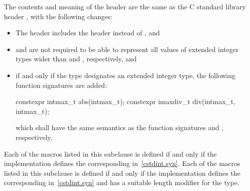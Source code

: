 \pnum
The contents and meaning of the header 
are the same as the C standard library header ,
with the following changes:
\begin{itemize}
\item
The header  includes the header  instead
of , and
\item
{} and  are not required
to be able to represent all values of extended integer types
wider than  and , respectively, and
\item
if and only if the type  designates an extended integer
type, the following function signatures are added:
\begin{codeblock}
constexpr intmax_t abs(intmax_t);
constexpr imaxdiv_t div(intmax_t, intmax_t);
\end{codeblock}
which shall have the same semantics as the function signatures
 and
, respectively.
\end{itemize}


\pnum
Each of the  macros listed in this subclause
is defined if and only if the implementation
defines the corresponding  in~\ref{cstdint.syn}.
Each of the  macros listed in this subclause
is defined if and only if the implementation
defines the corresponding  in~\ref{cstdint.syn} and
has a suitable  length modifier for the type.
